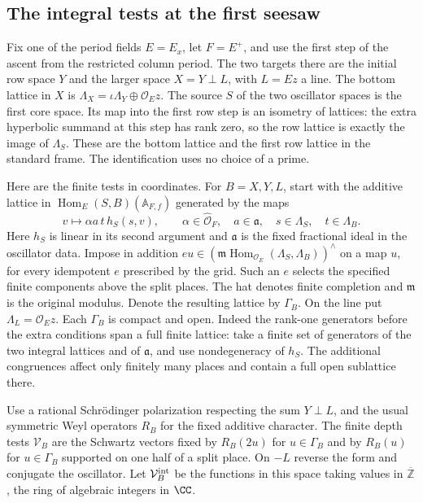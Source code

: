\documentclass[a4paper,11pt]{article}
\theoremstyle{definition}
\theoremstyle{remark}
\newcommand{\ZZ}{\mathbb Z}\newcommand{\ord}{\operatorname{ord}}
\numberwithin{equation}{section}
\begin{document}
\subsection{The integral tests at the first seesaw}\label{nav:VI-34}
Fix one of the period fields \(E=E_x\), let \(F=E^+\), and use
the first step of the ascent from the restricted column period.
The two targets there are the initial row space \(Y\) and the
larger space \(X=Y\perp L\), with \(L=Ez\) a line. The bottom
lattice in \(X\) is
\(\Lambda_X=\iota\Lambda_Y\oplus\mathcal O_E z\). The source
\(S\) of the two oscillator spaces is the first core space.
Its map into the first row step is an isometry of lattices:
the extra hyperbolic summand at this step has rank zero, so
the row lattice is exactly the image of \(\Lambda_S\).
These are the bottom lattice and the first row lattice in the
standard frame. The identification uses no choice of a prime.

Here are the finite tests in coordinates. For \(B=X,Y,L\), start
with the additive lattice in \(\operatorname{Hom}_E(S,B)(\mathbb A_{F,f})\)
generated by the maps
\[
   v\longmapsto \alpha a\,t\,h_S(s,v),\qquad
   \alpha\in\widehat{\mathcal O}_F,\quad
   a\in\mathfrak a,\quad s\in\Lambda_S,\quad t\in\Lambda_B .
\]
Here \(h_S\) is linear in its second argument and \(\mathfrak a\)
is the fixed fractional ideal in the oscillator data. Impose in addition
\(e u\in(\mathfrak m\operatorname{Hom}_{\mathcal O_E}
(\Lambda_S,\Lambda_B))^{\wedge}\) on a map \(u\), for every idempotent
\(e\) prescribed by the grid. Such an \(e\) selects the specified finite
components above the split places. The hat denotes finite completion and
\(\mathfrak m\) is the original modulus. Denote the resulting lattice
by \(\Gamma_B\). On the line put \(\Lambda_L=\mathcal O_E z\).
Each \(\Gamma_B\) is compact and open. Indeed the rank-one
generators before the extra conditions span a full finite lattice:
take a finite set of generators of the two integral lattices and of
\(\mathfrak a\), and use nondegeneracy of \(h_S\). The additional
congruences affect only finitely many places and contain a full open
sublattice there.

Use a rational Schr\"odinger polarization respecting the sum \(Y\perp L\),
and the usual symmetric Weyl operators \(R_B\) for the fixed additive
character. The finite depth tests \(\mathcal V_B\) are the Schwartz
vectors fixed by \(R_B(2u)\) for \(u\in\Gamma_B\) and by \(R_B(u)\)
for \(u\in\Gamma_B\) supported on one half of a split place.
On \(-L\) reverse the form and conjugate the oscillator. Let
\(\mathcal V_B^{\rm int}\) be the functions in this space taking values in
\(\overline{\ZZ}\), the ring of algebraic integers in \(\CC\).
\end{document}
